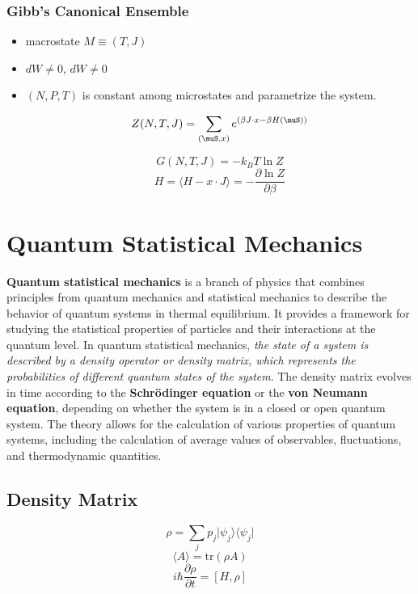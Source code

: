 \documentclass{article}
\begin{document}
\subsubsection{Gibb's Canonical Ensemble}
\begin{itemize}
    \item macrostate $M \equiv (T, J)
$
\item $dW \neq 0$, $dW \neq 0$
\item $(N, P, T)$ is constant among microstates and parametrize the system.

$$Z(N, T, J) = \sum_{(\muS, x)} e^{\left(\beta J \cdot x - \beta H(\muS)\right)}$$

$$G(N, T, J) = -k_BT \ln Z$$
$$H = \langle H - x \cdot J \rangle = -\frac{\partial \ln Z}{\partial \beta}$$



\end{itemize}




\section{Quantum Statistical Mechanics}

\textbf{Quantum statistical mechanics} is a branch of physics that combines principles from quantum mechanics and statistical mechanics to describe the behavior of quantum systems in thermal equilibrium. It provides a framework for studying the statistical properties of particles and their interactions at the quantum level.
In quantum statistical mechanics, \textit{the state of a system is described by a density operator or density matrix, which represents the probabilities of different quantum states of the system}. The density matrix evolves in time according to the \textbf{Schrödinger equation} or the \textbf{von Neumann equation}, depending on whether the system is in a closed or open quantum system.
The theory allows for the calculation of various properties of quantum systems, including the calculation of average values of observables, fluctuations, and thermodynamic quantities. 

\subsection{Density Matrix}
\large
$$\rho = \sum_{j} p_j \vert \psi_j \rangle \langle \psi_j \vert$$
$$\langle A \rangle = \text{tr}(\rho A)$$
$$i\hbar \frac{{\partial \rho}}{{\partial t}} = [H, \rho] $$
\end{document}
